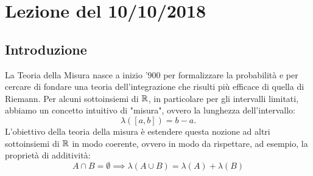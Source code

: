 \section{Lezione del 10/10/2018}
\subsection{Introduzione}
La Teoria della Misura nasce a inizio '900 per formalizzare la probabilità e per cercare di fondare una teoria dell'integrazione che risulti più efficace di quella di Riemann. Per alcuni sottoinsiemi di $\mathbb{R}$, in particolare per gli intervalli limitati, abbiamo un concetto intuitivo di "misura", ovvero la lunghezza dell'intervallo:
\[\lambda\left([a,b]\right) = b-a.\]
L'obiettivo della teoria della misura è estendere questa nozione ad altri sottoinsiemi di $\mathbb{R}$ in modo coerente, ovvero in modo da rispettare, ad esempio, la proprietà di additività:
\[A \cap B = \emptyset \implies \lambda(A\cup B) = \lambda(A) + \lambda(B)\]
